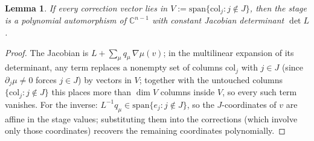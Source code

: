 \documentclass[11pt]{article}
\numberwithin{equation}{section}
\theoremstyle{plain}
\newtheorem{lemma}[theorem]{Lemma}
\theoremstyle{definition}
\theoremstyle{remark}
\newcommand{\C}{\mathbb{C}}
\begin{document}
\begin{lemma}\label{lem:stage}
If every correction vector lies in
$V:=\mathrm{span}\{\mathrm{col}_j:j\notin J\}$, then the stage is a polynomial
automorphism of $\C^{n-1}$ with constant Jacobian determinant $\det L$.
\end{lemma}

\begin{proof}
The Jacobian is $L+\sum_\mu q_\mu\,\nabla\mu(v)$; in the multilinear expansion
of its determinant, any term replaces a nonempty set of columns
$\mathrm{col}_j$ with $j\in J$ (since $\partial_j\mu\neq0$ forces $j\in J$) by
vectors in $V$; together with the untouched columns
$\{\mathrm{col}_j:j\notin J\}$ this places more than $\dim V$ columns inside
$V$, so every such term vanishes. For the inverse: $L^{-1}q_\mu\in
\mathrm{span}\{e_j:j\notin J\}$, so the $J$-coordinates of $v$ are affine in
the stage values; substituting them into the corrections (which involve only
those coordinates) recovers the remaining coordinates polynomially.
\end{proof}
\end{document}
